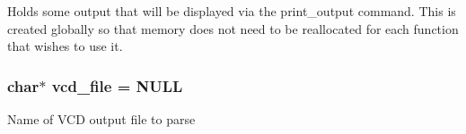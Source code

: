 Holds some output that will be displayed via the print\_\-output command. This is created globally so that memory does not need to be reallocated for each function that wishes to use it. 
\subsubsection{\setlength{\rightskip}{0pt plus 5cm}char$\ast$ {\bf vcd\_\-file} = NULL}\label{score_8c_a3}


Name of VCD output file to parse 